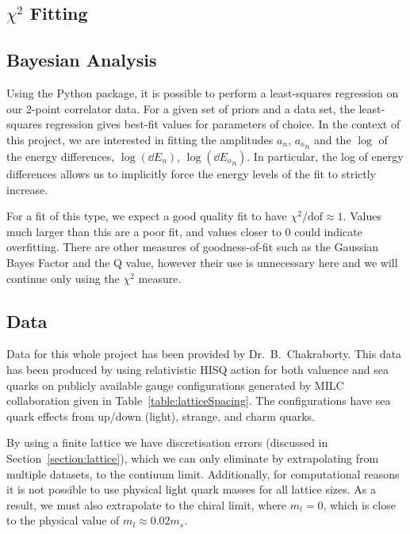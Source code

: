 \documentclass[a4paper,12pt]{article}
\begin{document}
\subsection{$\chi^2$ Fitting}

\subsection{Bayesian Analysis}
Using the \cite{lepage2020corrfitter} Python package, it is possible to perform a least-squares regression on our 2-point correlator data. For a given set of priors and a data set, the least-squares regression gives best-fit values for parameters of choice. In the context of this project, we are interested in fitting the amplitudes $a_n$, ${a_o}_n$ and the $\log$ of the energy differences, $\log(\dd E_n)$, $\log({\dd E_o}_n)$. In particular, the log of energy differences allows us to implicitly force the energy levels of the fit to strictly increase.

For a fit of this type, we expect a good quality fit to have $\chi^2/\mathrm{dof} \approx 1$. Values much larger than this are a poor fit, and values closer to $0$ could indicate overfitting. There are other measures of goodness-of-fit such as the Gaussian Bayes Factor and the Q value, however their use is unnecessary here and we will continue only using the $\chi^2$ measure.

\subsection{Data}
Data for this whole project has been provided by Dr.\ B.\ Chakraborty. This data has been produced by using relativistic HISQ action for both valuence and sea quarks on publicly available gauge configurations generated by MILC collaboration given in Table~\ref{table:latticeSpacing}. The configurations have sea quark effects from up/down (light), strange, and charm quarks.

By using a finite lattice we have discretisation errors (discussed in Section~\ref{section:lattice}), which we can only eliminate by extrapolating from multiple datasets, to the contiuum limit. Additionally, for computational reasons it is not possible to use physical light quark masses for all lattice sizes. As a result, we must also extrapolate to the chiral limit, where $m_l=0$, which is close to the physical value of $m_l \approx 0.02m_s$.
\end{document}
